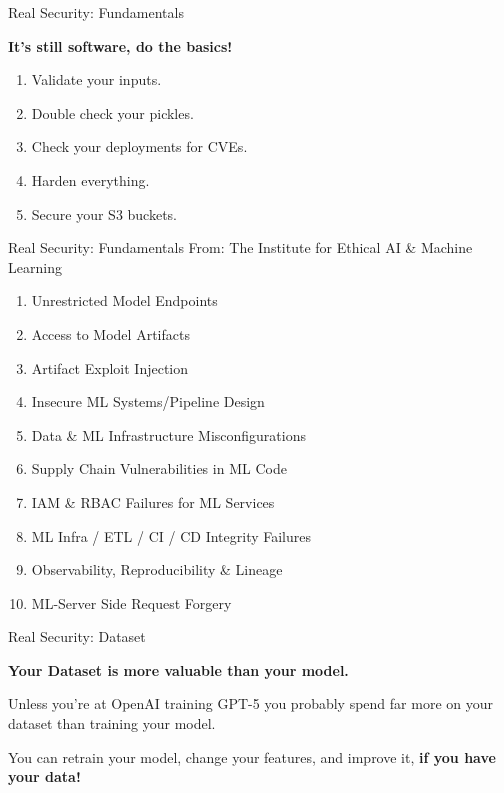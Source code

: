 \documentclass{beamer}
\begin{document}
\begin{frame}{Real Security: Fundamentals}
    \begin{center}
        \textbf{It's still software, do the basics!}
        \vspace{20pt}

    \end{center}
    \begin{enumerate}
        \item Validate your inputs. 
        \item Double check your pickles.
        \item Check your deployments for CVEs.
        \item Harden everything.
        \item Secure your S3 buckets.
    \end{enumerate}
\end{frame}

\begin{frame}{Real Security: Fundamentals}
    From: The Institute for Ethical AI \& Machine Learning \cite{mlsecops_10}
    \begin{enumerate}
        \item Unrestricted Model Endpoints
        \item Access to Model Artifacts 
        \item Artifact Exploit Injection 
        \item Insecure ML Systems/Pipeline Design
        \item Data \& ML Infrastructure Misconfigurations
        \item Supply Chain Vulnerabilities in ML Code
        \item IAM \& RBAC Failures for ML Services
        \item ML Infra / ETL / CI / CD Integrity Failures
        \item Observability, Reproducibility \& Lineage
        \item ML-Server Side Request Forgery
    \end{enumerate}
\end{frame}

\begin{frame}{Real Security: Dataset}
    \begin{center}
        \textbf{Your Dataset is more valuable than your model.}
        \vspace{20pt}

        Unless you're at OpenAI training GPT-5 you probably spend far more on your dataset than training your model.
        \vspace{10pt}

        You can retrain your model, change your features, and improve it, \textbf{if you have your data!}
    \end{center}
\end{frame}
\end{document}
